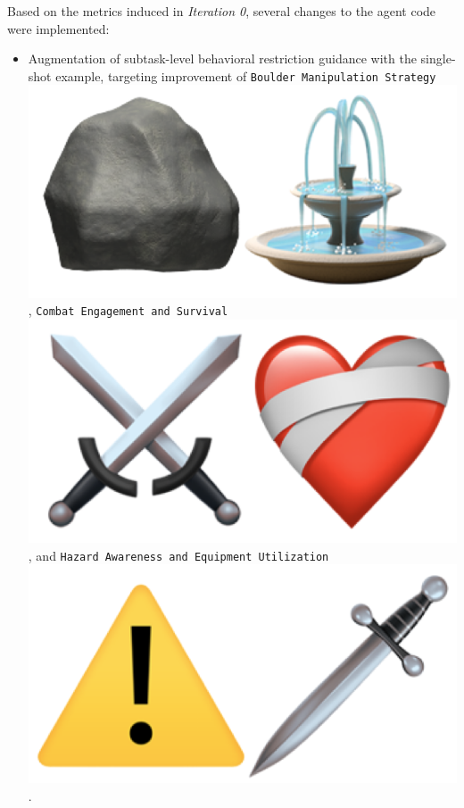 \begin{flushleft}
Based on the metrics induced in \emph{Iteration 0}, several changes to the agent code were implemented:
\begin{itemize}
    \item Augmentation of subtask-level behavioral restriction guidance with the single-shot example, targeting improvement of \texttt{Boulder Manipulation Strategy} \includegraphics[scale=0.07]{figs/emojis/mini_4.png}, \texttt{Combat Engagement and Survival} \includegraphics[scale=0.07]{figs/emojis/mini_5.png}, and \texttt{Hazard Awareness and Equipment Utilization} \includegraphics[scale=0.07]{figs/emojis/mini_3.png}.

\end{itemize}
\end{flushleft}
